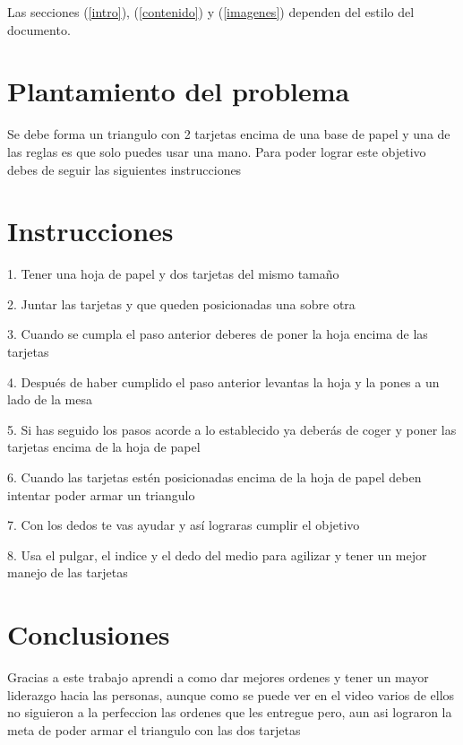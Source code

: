 \documentclass{article}
\begin{document}
Las secciones (\ref{intro}), (\ref{contenido}) y (\ref{imagenes}) dependen del estilo del documento.


\section{Plantamiento del problema}\label{Plantamiento del problema}
Se debe forma un triangulo con 2 tarjetas encima de una base de papel y una de las reglas es que solo puedes usar una mano. Para poder lograr este objetivo debes de seguir las siguientes instrucciones 

\section{Instrucciones}\label{Instrucciones}
1. Tener una hoja de papel y dos tarjetas del mismo tamaño 

2. Juntar las tarjetas y que queden posicionadas una sobre otra

3. Cuando se cumpla el paso anterior deberes de poner la hoja encima de las tarjetas

4. Después de haber cumplido el paso anterior levantas la hoja y la pones a un lado de la mesa

5. Si has seguido los pasos acorde a lo establecido ya deberás de coger y poner las tarjetas encima de la hoja de papel

6. Cuando las tarjetas estén posicionadas encima de la hoja de papel deben intentar poder armar un triangulo 

7. Con los dedos te vas ayudar y así lograras cumplir el objetivo

8. Usa el pulgar, el indice y el dedo del medio para agilizar y tener un mejor manejo de las tarjetas 


\section{Conclusiones}\label{Conclusiones}
Gracias a  este trabajo aprendi a como dar mejores ordenes y tener un mayor liderazgo hacia las personas, aunque como se puede ver en el video varios de ellos no siguieron a la perfeccion las ordenes que les entregue pero, aun asi lograron la meta de poder armar el triangulo con las dos tarjetas



\end{document}
